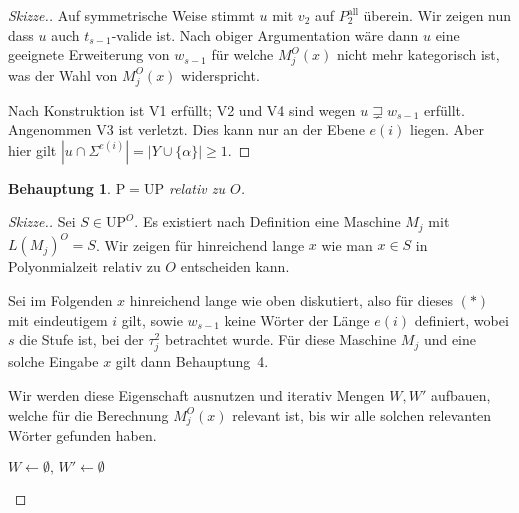 \documentclass[nofonts]{uebung}
\newtheorem{claim}[theorem]{Behauptung}
\def\P{\ensuremath{\mathrm{P}}}
\def\UP{\ensuremath{\mathrm{UP}}}
\begin{document}
\begin{proof}[Skizze.]
    Auf symmetrische Weise stimmt $u$ mit $v_2$ auf $P^\mathrm{all}_2$ überein.
    Wir zeigen nun dass $u$ auch $t_{s-1}$-valide ist.
    Nach obiger Argumentation wäre dann $u$ eine geeignete Erweiterung von $w_{s-1}$ für welche $M_j^O(x)$ nicht mehr kategorisch ist, was der Wahl von $M_j^O(x)$ widerspricht.

    Nach Konstruktion ist V1 erfüllt; V2 und V4 sind wegen $u\sqsupsetneq w_{s-1}$ erfüllt. Angenommen V3 ist verletzt. Dies kann nur an der Ebene $e(i)$ liegen. Aber hier gilt $|u\cap\Sigma^{e(i)}|=|Y\cup\{\alpha\}|\geq 1$.
\end{proof}

\begin{claim}
    $\P=\UP$ relativ zu $O$.
\end{claim}
\begin{proof}[Skizze.]
    Sei $S\in \UP^O$. Es existiert nach Definition eine Maschine $M_j$ mit $L(M_j)^O=S$.
    Wir zeigen für hinreichend lange $x$ wie man $x\in S$ in Polyonmialzeit relativ zu $O$ entscheiden kann.
    
    Sei im Folgenden $x$ hinreichend lange wie oben diskutiert, also für dieses $(\ast)$ mit eindeutigem $i$ gilt, sowie $w_{s-1}$ keine Wörter der Länge $e(i)$ definiert, wobei $s$ die Stufe ist, bei der $\tau^2_j$ betrachtet wurde.
    Für diese Maschine $M_j$ und eine solche Eingabe $x$ gilt dann Behauptung~4.

    Wir werden diese Eigenschaft ausnutzen und iterativ Mengen $W, W'$ aufbauen, welche für die Berechnung $M_j^O(x)$ relevant ist, bis wir alle solchen relevanten Wörter gefunden haben.

    \noindent
    \begin{algorithm}[H]
        $W\gets\emptyset,\, W'\gets\emptyset$\;
    \end{algorithm}


\end{proof}
\end{document}
